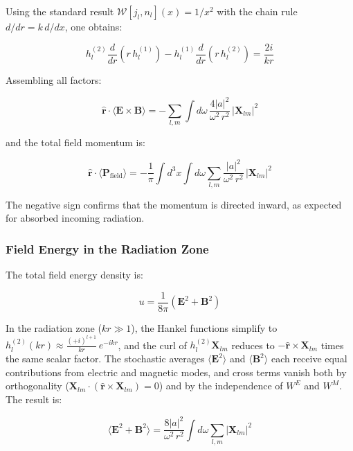 \documentclass {article}
\renewcommand\vec{\mathbf}
\let\OldHat\hat
\renewcommand{\hat}[1]{\OldHat{\mathbf{#1}}}
\begin{document}
Using the standard result $\mathcal{W}[j_l, n_l](x) = 1/x^2$ with the chain rule $d/dr = k\, d/dx$, one obtains:

\begin{equation}
h_l^{(2)} \frac{d}{dr}(r\, h_l^{(1)}) - h_l^{(1)} \frac{d}{dr}(r\, h_l^{(2)}) = \frac{2i}{kr}
\end{equation}

\noindent Assembling all factors:

\begin{equation}
\boxed{
	\hat{r} \cdot \langle \vec{E} \times \vec{B} \rangle = -\sum_{l,m} \int d\omega\, \frac{4|a|^2}{\omega^2\, r^2}\, |\vec{X}_{lm}|^2
}
\end{equation}

\noindent and the total field momentum is:

\begin{equation}
\boxed{
	\hat{r} \cdot \langle \vec{P}_{\text{field}} \rangle = -\frac{1}{\pi} \int d^3x \int d\omega \sum_{l,m} \frac{|a|^2}{\omega^2\, r^2}\, |\vec{X}_{lm}|^2
}
\label{eq:momentum}
\end{equation}

\noindent The negative sign confirms that the momentum is directed inward, as expected for absorbed incoming radiation.

\subsubsection{Field Energy in the Radiation Zone}

The total field energy density is:

\begin{equation}
u = \frac{1}{8\pi}(\vec{E}^2 + \vec{B}^2)
\end{equation}

\noindent In the radiation zone ($kr \gg 1$), the Hankel functions simplify to $h_l^{(2)}(kr) \approx \frac{(+i)^{l+1}}{kr}\, e^{-ikr}$, and the curl of $h_l^{(2)} \vec{X}_{lm}$ reduces to $-\hat{r} \times \vec{X}_{lm}$ times the same scalar factor. The stochastic averages $\langle \vec{E}^2 \rangle$ and $\langle \vec{B}^2 \rangle$ each receive equal contributions from electric and magnetic modes, and cross terms vanish both by orthogonality ($\vec{X}_{lm} \cdot (\hat{r} \times \vec{X}_{lm}) = 0$) and by the independence of $W^E$ and $W^M$. The result is:

\begin{equation}
\langle \vec{E}^2 + \vec{B}^2 \rangle = \frac{8|a|^2}{\omega^2\, r^2} \int d\omega \sum_{l,m} |\vec{X}_{lm}|^2
\end{equation}
\end{document}
